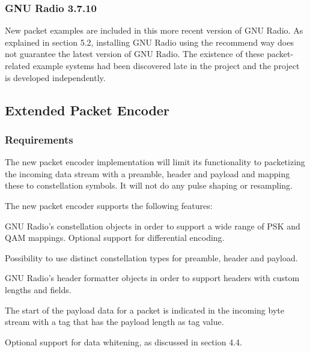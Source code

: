 \subsubsection{GNU Radio 3.7.10}
New packet examples are included in this more recent version of GNU Radio. As explained in section 5.2, installing GNU Radio using the recommend way does not guarantee the latest version of GNU Radio. The existence of these packet-related example systems had been discovered late in the project and the project is developed independently.
\newpage
\subsection{Extended Packet Encoder}
\subsubsection{Requirements}
The new packet encoder implementation will limit its functionality to packetizing the incoming data stream with a preamble, header and payload and mapping these to constellation symbols. It will not do any pulse shaping or resampling.\medskip


The new packet encoder supports the following features:
\begin{tight_itemize}
\item GNU Radio's constellation objects in order to support a wide range of PSK and QAM mappings. Optional support for differential encoding.
\item Possibility to use distinct constellation types for preamble, header and payload.
\item GNU Radio's header formatter objects in order to support headers with custom lengths and fields.
\item The start of the payload data for a packet is indicated in the incoming byte stream with a tag that has the payload length as tag value.
\item Optional support for data whitening, as discussed in section 4.4.
\end{tight_itemize}



